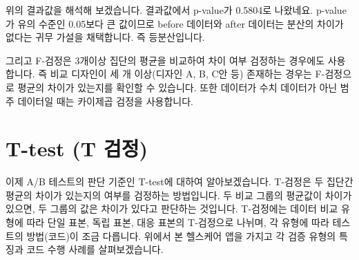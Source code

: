 \documentclass[
  letterpaper,
]{book}
\begin{document}
위의 결과값을 해석해 보겠습니다. 결과값에서 p-value가 0.5804로 나왔네요.
p-value가 유의 수준인 0.05보다 큰 값이므로 before 데이터와 after
데이터는 분산의 차이가 없다는 귀무 가설을 채택합니다. 즉 등분산입니다.

그리고 F-검정은 3개이상 집단의 평균을 비교하여 차이 여부 검정하는
경우에도 사용합니다. 즉 비교 디자인이 세 개 이상(디자인 A, B, C안 등)
존재하는 경우는 F-검정으로 평균의 차이가 있는지를 확인할 수 있습니다.
또한 데이터가 수치 데이터가 아닌 범주 데이터일 때는 카이제곱 검정을
사용합니다.

\section{T-test (T 검정)}\label{t-test-t-uxac80uxc815}

이제 A/B 테스트의 판단 기준인 T-test에 대하여 알아보겠습니다. T-검정은
두 집단간 평균의 차이가 있는지의 여부를 검정하는 방법입니다. 두 비교
그룹의 평균값이 차이가 있으면, 두 그룹의 값은 차이가 있다고 판단하는
것입니다. T-검정에는 데이터 비교 유형에 따라 단일 표본, 독립 표본, 대응
표본의 T-검정으로 나뉘며, 각 유형에 따라 테스트의 방법(코드)이 조금
다릅니다. 위에서 본 헬스케어 앱을 가지고 각 검증 유형의 특징과 코드 수행
사례를 살펴보겠습니다.
\end{document}
